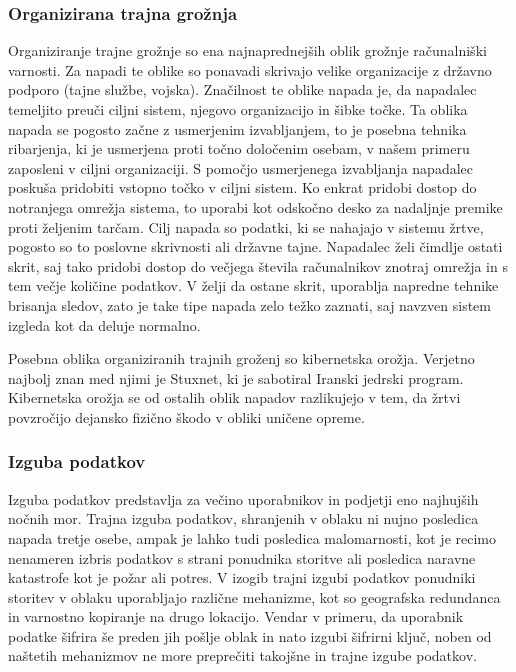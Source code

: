 \documentclass[12pt,a4paper,openany]{book}
\begin{document}
\subsubsection{Organizirana trajna grožnja}
Organiziranje trajne grožnje so ena najnaprednejših oblik grožnje računalniški varnosti. Za napadi te oblike so ponavadi skrivajo velike organizacije z državno podporo (tajne službe, vojska). Značilnost te oblike napada je, da napadalec temeljito preuči ciljni sistem, njegovo organizacijo in šibke točke. Ta oblika napada se pogosto začne z usmerjenim izvabljanjem, to je posebna tehnika ribarjenja, ki je usmerjena proti točno določenim osebam, v našem primeru zaposleni v ciljni organizaciji. S pomočjo usmerjenega izvabljanja napadalec poskuša pridobiti vstopno točko v ciljni sistem. Ko enkrat pridobi dostop do notranjega omrežja sistema, to uporabi kot odskočno desko za nadaljnje premike proti željenim tarčam. Cilj napada so podatki, ki se nahajajo v sistemu žrtve, pogosto so to poslovne skrivnosti ali državne tajne. Napadalec želi čimdlje ostati skrit, saj tako pridobi dostop do večjega števila računalnikov znotraj omrežja in s tem večje količine podatkov. V želji da ostane skrit, uporablja napredne tehnike brisanja sledov, zato je take tipe napada zelo težko zaznati, saj navzven sistem izgleda kot da deluje normalno.

Posebna oblika organiziranih trajnih groženj so kibernetska orožja. Verjetno najbolj znan med njimi je Stuxnet, ki je sabotiral Iranski jedrski program. Kibernetska orožja se od ostalih oblik napadov razlikujejo v tem, da žrtvi povzročijo dejansko fizično škodo v obliki uničene opreme.

\subsubsection{Izguba podatkov}
Izguba podatkov predstavlja za večino uporabnikov in podjetji eno najhujših nočnih mor. Trajna izguba podatkov, shranjenih v oblaku ni nujno posledica napada tretje osebe, ampak je lahko tudi posledica malomarnosti, kot je recimo nenameren izbris podatkov s strani ponudnika storitve ali posledica naravne katastrofe kot je požar ali potres. V izogib trajni izgubi podatkov ponudniki storitev v oblaku uporabljajo različne mehanizme, kot so geografska redundanca in varnostno kopiranje na drugo lokacijo. Vendar v primeru, da uporabnik podatke šifrira še preden jih pošlje oblak in nato izgubi šifrirni ključ, noben od naštetih mehanizmov ne more preprečiti takojšne in trajne izgube podatkov.
\end{document}
